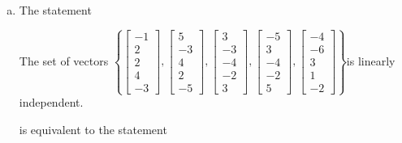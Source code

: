 \begin{exerciseAnswer}
\begin{enumerate}[(a)]
\item The statement 
\begin{center}\begin{minipage}{0.8\textwidth}
 The set of vectors \( \left\{ \left[\begin{array}{c}
-1 \\
2 \\
2 \\
4 \\
-3
\end{array}\right] , \left[\begin{array}{c}
5 \\
-3 \\
4 \\
2 \\
-5
\end{array}\right] , \left[\begin{array}{c}
3 \\
-3 \\
-4 \\
-2 \\
3
\end{array}\right] , \left[\begin{array}{c}
-5 \\
3 \\
-4 \\
-2 \\
5
\end{array}\right] , \left[\begin{array}{c}
-4 \\
-6 \\
3 \\
1 \\
-2
\end{array}\right] \right\} \)is linearly independent.
\end{minipage}\end{center}
     is equivalent to the statement 
\begin{center}\begin{minipage}{0.8\textwidth}
 The vector equation \( x_{1} \left[\begin{array}{c}
-1 \\
2 \\
2 \\
4 \\
-3
\end{array}\right] + x_{2} \left[\begin{array}{c}
5 \\
-3 \\

\end{array}
\end{minipage}
\end{center}
\end{enumerate}
\end{exerciseAnswer}
